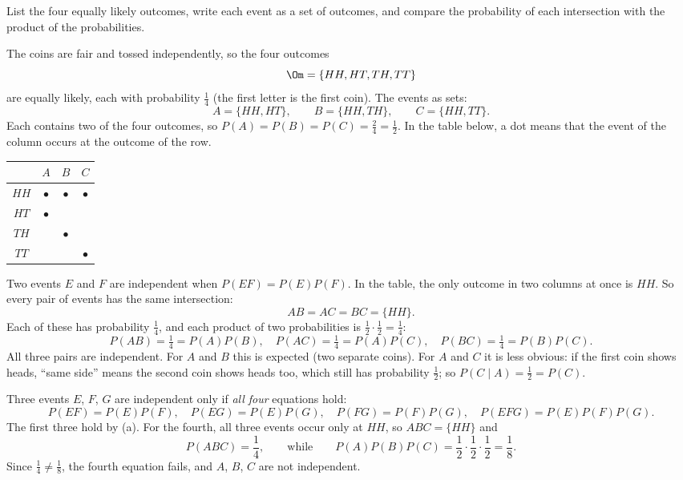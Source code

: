 \begin{solution}
	\idea List the four equally likely outcomes, write each event as a set of
	outcomes, and compare the probability of each intersection with the
	product of the probabilities.

	 The coins are fair and tossed
	independently, so the four outcomes
	\[ \Om=\{HH,HT,TH,TT\} \]
	are equally likely, each with probability $\frac14$ (the first letter is
	the first coin). The events as sets:
	\[ A=\{HH,HT\},\qquad B=\{HH,TH\},\qquad C=\{HH,TT\}. \]
	Each contains two of the four outcomes, so
	$P(A)=P(B)=P(C)=\frac24=\frac12$. In the table below, a dot means that
	the event of the column occurs at the outcome of the row.

	\begin{center}
		\begin{tabular}{c|ccc}
			     & $A$ & $B$ & $C$ \\ \hline
			$HH$ & $\bullet$ & $\bullet$ & $\bullet$ \\
			$HT$ & $\bullet$ &            &            \\
			$TH$ &            & $\bullet$ &            \\
			$TT$ &            &            & $\bullet$
		\end{tabular}
	\end{center}

	 Two events $E$ and $F$ are independent when
	$P(EF)=P(E)P(F)$. In the table, the only outcome in two columns at once is
	$HH$. So every pair of events has the same intersection:
	\[ AB=AC=BC=\{HH\}. \]
	Each of these has probability $\frac14$, and each product of two
	probabilities is $\frac12\cdot\frac12=\frac14$:
	\[ P(AB)=\tfrac14=P(A)P(B),\quad P(AC)=\tfrac14=P(A)P(C),\quad
		P(BC)=\tfrac14=P(B)P(C). \]
	All three pairs are independent. For $A$ and $B$ this is expected (two
	separate coins). For $A$ and $C$ it is less obvious: if the first coin
	shows heads, ``same side'' means the second coin shows heads too, which
	still has probability $\frac12$; so $P(C\mid A)=\frac12=P(C)$.

	 Three events $E$, $F$, $G$ are independent only if \emph{all
	four} equations hold:
	\[ P(EF)=P(E)P(F),\quad P(EG)=P(E)P(G),\quad P(FG)=P(F)P(G),\quad
		P(EFG)=P(E)P(F)P(G). \]
	The first three hold by (a). For the fourth, all three events occur only
	at $HH$, so $ABC=\{HH\}$ and
	\[ P(ABC)=\frac14,\qquad\text{while}\qquad
		P(A)P(B)P(C)=\frac12\cdot\frac12\cdot\frac12=\frac18. \]
	Since $\frac14\ne\frac18$, the fourth equation fails, and $A$, $B$, $C$
	are not independent.


\end{solution}
